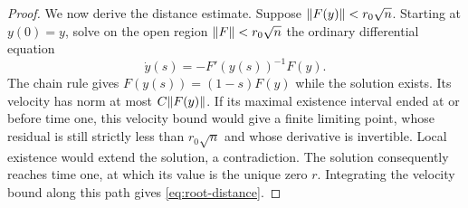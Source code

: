 \begin{proof}
We now derive the distance estimate. Suppose
$\lVert F(y)\rVert<r_0\sqrt n$. Starting at $y(0)=y$, solve on the
open region $\lVert F\rVert<r_0\sqrt n$ the ordinary differential equation
\[
 \dot y(s)=-F'(y(s))^{-1}F(y).
\]
The chain rule gives $F(y(s))=(1-s)F(y)$ while the solution exists.
Its velocity has norm at most $C\lVert F(y)\rVert$.  If its maximal
existence interval ended at or before time one, this velocity bound would
give a finite limiting point, whose residual is still strictly less
than $r_0\sqrt n$ and whose derivative is invertible.  Local existence
would extend the solution, a contradiction. The solution consequently
reaches time one, at which its value is the
unique zero $r$. Integrating the velocity bound along this path gives
\eqref{eq:root-distance}.
\end{proof}
